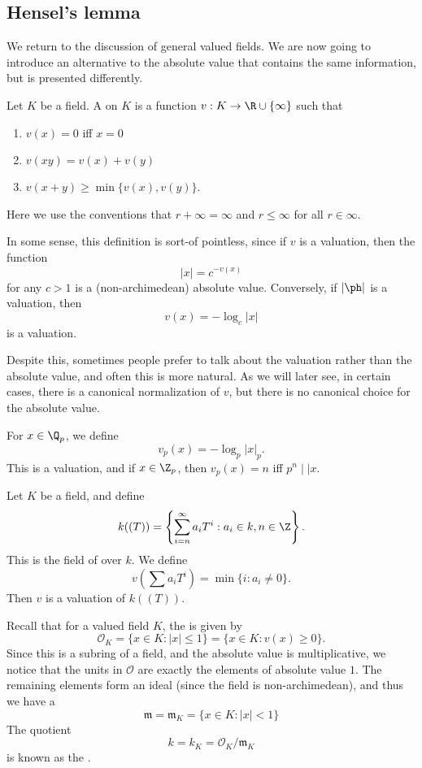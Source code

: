 \documentclass[a4paper]{article}
\begin{document}
\subsection{Hensel's lemma}
We return to the discussion of general valued fields. We are now going to introduce an alternative to the absolute value that contains the same information, but is presented differently.
\begin{defi}[Valuation]
  Let $K$ be a field. A  on $K$ is a function $v: K \to \R \cup \{\infty\}$ such that
  \begin{enumerate}
    \item $v(x) = 0$ iff $x = 0$
    \item $v(xy) = v(x) + v(y)$
    \item $v(x + y) \geq \min\{v(x), v(y)\}$.
  \end{enumerate}
\end{defi}
Here we use the conventions that $r + \infty = \infty$ and $r \leq \infty$ for all $r \in \infty$.

In some sense, this definition is sort-of pointless, since if $v$ is a valuation, then the function
\[
  |x| = c^{-v(x)}
\]
for any $c > 1$ is a (non-archimedean) absolute value. Conversely, if $|\ph|$ is a valuation, then
\[
  v(x) = - \log_c |x|
\]
is a valuation.

Despite this, sometimes people prefer to talk about the valuation rather than the absolute value, and often this is more natural. As we will later see, in certain cases, there is a canonical normalization of $v$, but there is no canonical choice for the absolute value.

\begin{eg}
  For $x \in \Q_p$, we define
  \[
    v_p(x) = -\log_p |x|_p.
  \]
  This is a valuation, and if $x \in \Z_p$, then $v_p(x) = n$ iff $p^n \mid\mid x$.
\end{eg}

\begin{eg}
  Let $K$ be a field, and define
  \[
    k((T)) = \left\{\sum_{i = n}^\infty a_i T^i: a_i \in k, n \in \Z\right\}.
  \]
  This is the field of  over $k$. We define
  \[
    v\left(\sum a_i T^i\right) = \min\{i: a_i \not= 0\}.
  \]
  Then $v$ is a valuation of $k((T))$.
\end{eg}

Recall that for a valued field $K$, the  is given by
\[
  \mathcal{O}_K = \{x \in K: |x|\leq 1\} = \{x \in K: v(x) \geq 0\}.
\]
Since this is a subring of a field, and the absolute value is multiplicative, we notice that the units in $\mathcal{O}$ are exactly the elements of absolute value $1$. The remaining elements form an ideal (since the field is non-archimedean), and thus we have a 
\[
  \mathfrak{m} = \mathfrak{m}_K = \{x \in K: |x| < 1\}
\]
The quotient
\[
  k = k_K = \mathcal{O}_K/\mathfrak{m}_K
\]
is known as the .
\end{document}
